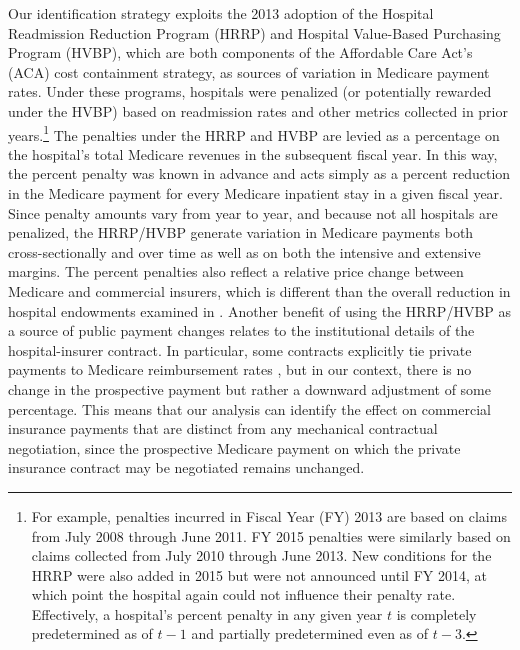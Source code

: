 \documentclass[12pt]{article}
\begin{document}
Our identification strategy exploits the 2013 adoption of the Hospital Readmission Reduction Program (HRRP) and Hospital Value-Based Purchasing Program (HVBP), which are both components of the Affordable Care Act's (ACA) cost containment strategy, as sources of variation in Medicare payment rates. Under these programs, hospitals were penalized (or potentially rewarded under the HVBP) based on readmission rates and other metrics collected in prior years.\footnote{ For example, penalties incurred in Fiscal Year (FY) 2013 are based on claims from July 2008 through June 2011. FY 2015 penalties were similarly based on claims collected from July 2010 through June 2013. New conditions for the HRRP were also added in 2015 but were not announced until FY 2014, at which point the hospital again could not influence their penalty rate. Effectively, a hospital's percent penalty in any given year $t$ is completely predetermined as of $t-1$ and partially predetermined even as of $t-3$.}   The penalties under the HRRP and HVBP are levied as a percentage on the hospital's total Medicare revenues in the subsequent fiscal year. In this way, the percent penalty was known in advance and acts simply as a percent reduction in the Medicare payment for every Medicare inpatient stay in a given fiscal year. Since penalty amounts vary from year to year, and because not all hospitals are penalized, the HRRP/HVBP generate variation in Medicare payments both cross-sectionally and over time as well as on both the intensive and extensive margins. The percent penalties also reflect a relative price change between Medicare and commercial insurers, which is different than the overall reduction in hospital endowments examined in \cite{dranove2017}. Another benefit of using the HRRP/HVBP as a source of public payment changes relates to the institutional details of the hospital-insurer contract. In particular, some contracts explicitly tie private payments to Medicare reimbursement rates \citep{cooper2015}, but in our context, there is no change in the prospective payment but rather a downward adjustment of some percentage. This means that our analysis can identify the effect on commercial insurance payments that are distinct from any mechanical contractual negotiation, since the prospective Medicare payment on which the private insurance contract may be negotiated remains unchanged.
\end{document}
